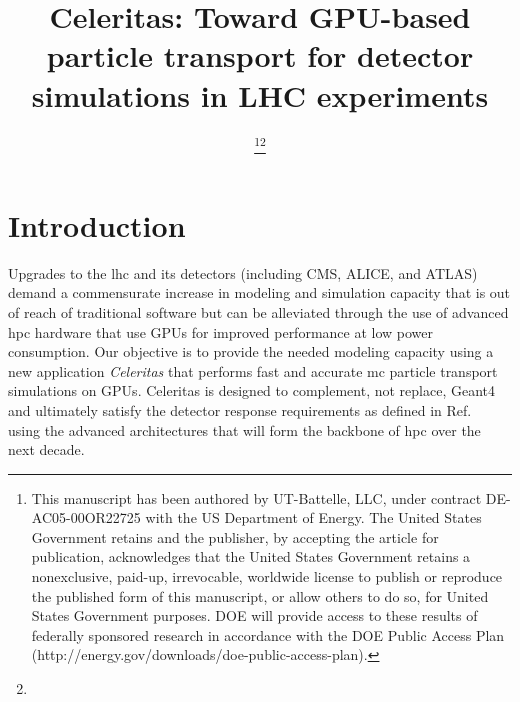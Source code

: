 \documentclass{webofc}
\begin{document}
\title{Celeritas: Toward GPU-based particle transport for detector simulations
    in LHC experiments}
    \author{
    \fnsep \thanks{This manuscript has been authored
    by UT-Battelle, LLC, under contract DE-AC05-00OR22725 with the US Department
    of Energy. The United States Government retains and the publisher, by
    accepting the article for publication, acknowledges that the United States
    Government retains a nonexclusive, paid-up, irrevocable, worldwide license
    to publish or reproduce the published form of this manuscript, or allow
    others to do so, for United States Government purposes. DOE will provide
    access to these results of federally sponsored research in accordance with
    the DOE Public Access Plan
    (http://energy.gov/downloads/doe-public-access-plan).}\fnsep\thanks{
    }
    \and
     
    \and
     
    \and
     
    \and
     
    \and
     
    \and
     
    \and
     
}



\maketitle

\section{Introduction}
\label{sec:introduction}

Upgrades to the \ac{lhc} and its detectors (including CMS, ALICE, and ATLAS)
demand a commensurate increase in modeling and simulation capacity that is out
of reach of traditional software but can be alleviated through the use of
advanced \ac{hpc} hardware that use GPUs for improved performance at low power
consumption.  Our objective is to provide the needed modeling capacity using a
new application \emph{Celeritas} that performs fast and accurate \ac{mc}
particle transport simulations on GPUs. Celeritas is designed to complement, not
replace, Geant4 and ultimately satisfy the detector response requirements as
defined in Ref.~\cite{the_hep_software_foundation_roadmap_2019} using  the
advanced architectures that will form the backbone of \ac{hpc} over the next
decade.
\end{document}
